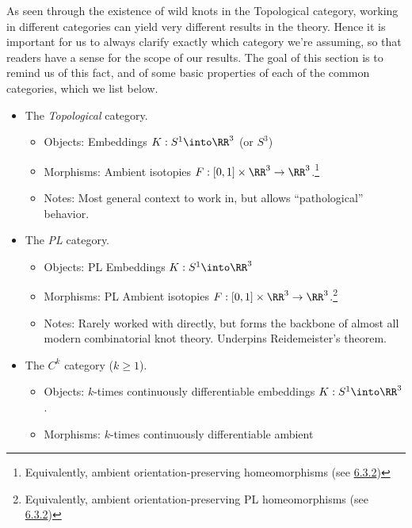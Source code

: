 As seen through the existence of wild knots in the Topological
category, working in different categories can yield very different
results in the theory. Hence it is important for us to always clarify
exactly which category we're assuming, so that readers have a sense
for the scope of our results. The goal of this section is to remind us
of this fact, and of some basic properties of each of the common
categories, which we list below.

\begin{itemize}
  \item The \emph{Topological} category.
    \begin{itemize}
      \item Objects: Embeddings $K : S^1 \into \RR^3$ (or $S^3$)
      \item Morphisms: Ambient isotopies $F : [0,1] \times \RR^3 \to
        \RR^3$.\footnote{Equivalently, ambient orientation-preserving
        homeomorphisms (see \hyperlink{link:equiv-in-top}{6.3.2})}
      \item Notes: Most general context to work in, but allows
        ``pathological'' behavior.
    \end{itemize}
  \item The \emph{PL} category.
    \begin{itemize}
      \item Objects: PL Embeddings $K : S^1 \into \RR^3$
      \item Morphisms: PL Ambient isotopies $F : [0,1] \times \RR^3
        \to \RR^3$.\footnote{Equivalently, ambient
        orientation-preserving PL homeomorphisms (see
        \hyperlink{link:equiv-in-pl}{6.3.2})}
      \item Notes: Rarely worked with directly, but forms the backbone
        of almost all modern combinatorial knot theory. Underpins
        Reidemeister's theorem.
    \end{itemize}
  \item The $C^k$ category ($k \geq 1$).
    \begin{itemize}
      \item Objects: $k$-times continuously differentiable embeddings
        $K : S^1 \into \RR^3$.
      \item Morphisms: $k$-times continuously differentiable ambient

\end{itemize}
\end{itemize}
